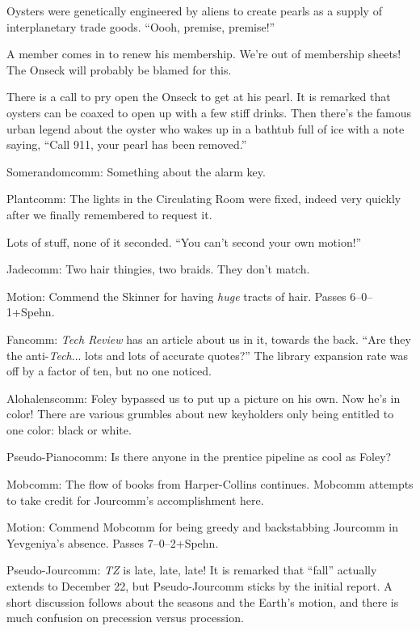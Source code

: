 \documentclass[12pt]{article}
\begin{document}
Oysters were genetically engineered by aliens to create pearls as a
supply of interplanetary trade goods.  ``Oooh, premise, premise!''

A member comes in to renew his membership.  We're out of membership
sheets!  The Onseck will probably be blamed for this.

There is a call to pry open the Onseck to get at his pearl.  It is
remarked that oysters can be coaxed to open up with a few stiff
drinks.  Then there's the famous urban legend about the oyster who
wakes up in a bathtub full of ice with a note saying, ``Call 911,
your pearl has been removed.''

Somerandomcomm: Something about the alarm key.

Plantcomm: The lights in the Circulating Room were fixed, indeed very
quickly after we finally remembered to request it.

Lots of stuff, none of it seconded.  ``You can't second your own
motion!''

Jadecomm: Two hair thingies, two braids.  They don't match.

Motion: Commend the Skinner for having {\em huge} tracts of hair.
Passes 6--0--1+Spehn.

Fancomm: {\em Tech Review} has an article about us in it, towards
the back.  ``Are they the anti-{\em Tech}... lots and lots of
accurate quotes?''  The library expansion rate was off by a factor
of ten, but no one noticed.

Alohalenscomm: Foley bypassed us to put up a picture on his own.
Now he's in color!  There are various grumbles about new keyholders
only being entitled to one color: black or white.

Pseudo-Pianocomm: Is there anyone in the prentice pipeline as
cool as Foley?

Mobcomm: The flow of books from Harper-Collins continues.  Mobcomm
attempts to take credit for Jourcomm's accomplishment here.

Motion: Commend Mobcomm for being greedy and backstabbing Jourcomm
in Yevgeniya's absence.  Passes 7--0--2+Spehn.

Pseudo-Jourcomm: {\em TZ} is late, late, late!  It is remarked that
``fall'' actually extends to December 22, but Pseudo-Jourcomm sticks
by the initial report.  A short discussion follows about the seasons
and the Earth's motion, and there is much confusion on precession
versus procession.

\end{document}
